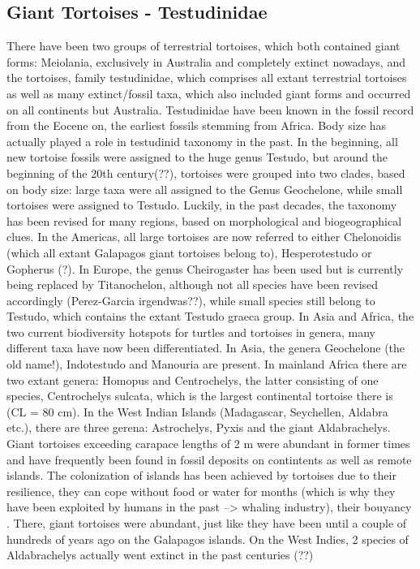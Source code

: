 \subsection{Giant Tortoises - Testudinidae}
There have been two groups of terrestrial tortoises, which both contained giant forms: Meiolania, exclusively in Australia and completely extinct nowadays, and the tortoises, family testudinidae, which comprises all extant terrestrial tortoises as well as many extinct/fossil taxa, which also included giant forms and occurred on all continents but Australia.
Testudinidae have been known in the fossil record from the Eocene on, the earliest fossils stemming from Africa.
Body size has actually played a role in testudinid taxonomy in the past. In the beginning, all new tortoise fossils were assigned to the huge genus Testudo, but around the beginning of the 20th century(??), tortoises were grouped into two clades, based on body size: large taxa were all assigned to the Genus Geochelone, while small tortoises were assigned to Testudo.
Luckily, in the past decades, the taxonomy has been revised for many regions, based on morphological and biogeographical clues. In the Americas, all large tortoises are now referred to either Chelonoidis (which all extant Galapagos giant tortoises belong to), Hesperotestudo or Gopherus (?). In Europe, the genus Cheirogaster has been used but is currently being replaced by Titanochelon, although not all species have been revised accordingly (Perez-Garcia irgendwas??), while small species still belong to Testudo, which contains the extant Testudo graeca group. In Asia and Africa, the two current biodiversity hotspots for turtles and tortoises in genera, many different taxa have now been differentiated. In Asia, the genera Geochelone (the old name!), Indotestudo and Manouria are present. In mainland Africa there are two extant genera: Homopus and Centrochelys, the latter consisting of one species, Centrochelys sulcata, which is the largest continental tortoise there is (CL = 80 cm). In the West Indian Islands (Madagascar, Seychellen, Aldabra etc.), there are three gerena: Astrochelys, Pyxis and the giant Aldabrachelys.
Giant tortoises exceeding carapace lengths of 2 m were abundant in former times and have frequently been found in fossil deposits on contintents as well as remote islands. The colonization of islands has been achieved by tortoises due to their resilience, they can cope without food or water for months (which is why they have been exploited by humans in the past --> whaling industry), their bouyancy \citep{Gerlach2006, Patterson1973}. There, giant tortoises were abundant, just like they have been until a couple of hundreds of years ago on the Galapagos islands. On the West Indies, 2 species of Aldabrachelys actually went extinct in the past centuries (??)
